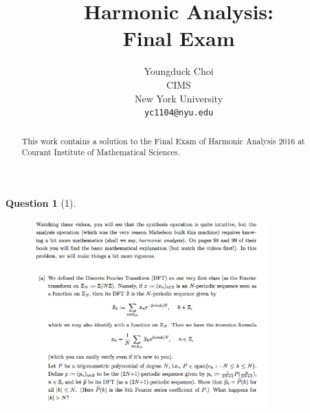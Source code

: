 \documentclass{article} %
\title{Harmonic Analysis:  \\
Final Exam}
\author{
Youngduck Choi \\
CIMS \\
New York University\\
\texttt{yc1104@nyu.edu} \\
}
\theoremstyle{quest}
\newtheorem*{question}{Question}
\begin{document}
\maketitle

\begin{abstract}
This work contains a solution to the Final Exam
of Harmonic Analysis 2016 at Courant Institute of Mathematical Sciences.
\end{abstract}

\bigskip

\begin{question}[1]
\hfill
\begin{figure}[h!]
  \centering
    \includegraphics[width=0.8\textwidth]{HA-f-1.png}
\end{figure}
\end{question}

\newpage 
\end{document}
